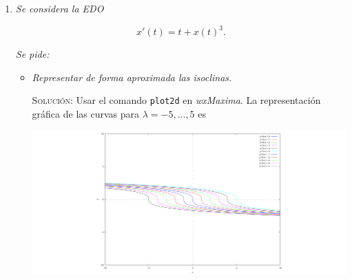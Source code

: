 \documentclass{article}
\begin{document}
\begin{enumerate}
\begin{itemize}
        \[x''(t) = x(t),\]

        de donde la inspiración puede provenir de las funciones trigonométricas hiperbólicas.

        \item[$b)$] En este caso hay que estrujar algo más los sesos. Primero calculamos la primera derivada, quedándose
        
        \[x'(t) = Ae^t + Bte^t + Be^t = x(t) + Be^t,\]

        de donde se deduce que $Be^t = x'(t) - x(t)$. A continuación, calculamos la segunda derivada

        \[x''(t) = Ae^t + Bte^t + 2Be^t = x(t) + 2(x'(t) - x(t)),\]

        a paritr de lo cual concluimos sin mucho esfuerzo que la EDO satisfecha por esta familia es

        \[x''(t)  = 2x'(t) - x(t).\]

        \item[$c)$] Me aburro, se deja como enigma al cuidado del lector\footnote{Indicación: deriva, anda.}.
    \end{itemize}

    $\hfill\square$

    \vspace{12px}

    \item \textit{Se considera la EDO}
    
    \[x'(t) = t + x(t)^3.\]

    \textit{Se pide:}

    \begin{itemize}
        \item \textit{Representar de forma aproximada las isoclinas.}

        \vspace{7px}

        \textsc{Solución:} Usar el comando \texttt{plot2d} en \textit{wxMaxima}. La representación gráfica de las curvas para $\lambda = -5, ..., 5$ es

        \includegraphics[width=\textwidth]{curva.png}


\end{itemize}
\end{enumerate}
\end{document}
